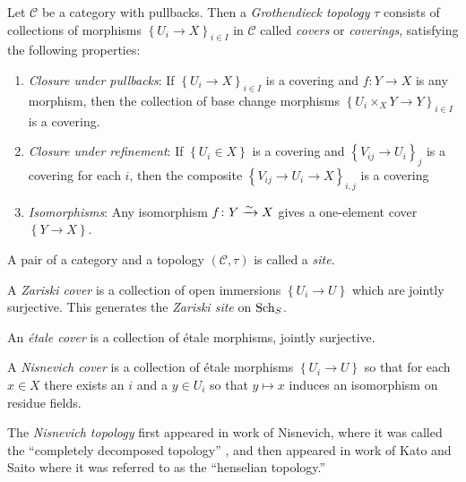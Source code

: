 \documentclass[11pt,openany]{book}
\begin{document}
\begin{definition} Let $\mathscr{C}$ be a category with pullbacks. Then a \textit{Grothendieck topology} $\tau$ consists of collections of morphisms $\left\{ U_i \to X \right\}_{i\in I}$ in $\mathscr{C}$ called \textit{covers} or \textit{coverings}, satisfying the following properties:
\begin{enumerate}
    \item \textit{Closure under pullbacks}: If $\left\{ U_i \to X \right\}_{i\in I}$ is a covering and $f \colon Y \to X$ is any morphism, then the collection of base change morphisms $\left\{ U_i \times_X Y \to Y \right\}_{i\in I}$ is a covering.
    \item \textit{Closure under refinement}: If $\left\{ U_i \in X \right\}$ is a covering and $\left\{ V_{ij} \to U_i \right\}_j$ is a covering for each $i$, then the composite $\left\{ V_{ij} \to U_i \to X \right\}_{i,j}$ is a covering
    \item \textit{Isomorphisms}: Any isomorphism $f\colon Y \xrightarrow{\sim} X$ gives a one-element cover $\left\{ Y \to X \right\}$.
\end{enumerate}
A pair of a category and a topology $(\mathscr{C},\tau)$ is called a \textit{site}.
\end{definition}

\begin{example} A \textit{Zariski cover} is a collection of open immersions $\left\{ U_i \to U \right\}$ which are jointly surjective. This generates the \textit{Zariski site} on $\mathrm{Sch}_S$.
\end{example}

\begin{example} An \textit{\'etale cover} is a collection of \'etale morphisms, jointly surjective.
\end{example}

\begin{example} A \textit{Nisnevich cover} is a collection of \'etale morphisms $\left\{ U_i \to U \right\}$ so that for each $x\in X$ there exists an $i$ and a $y\in U_i$ so that $y\mapsto x$ induces an isomorphism on residue fields.
\end{example}

\begin{remark} The \textit{Nisnevich topology} first appeared in work of Nisnevich, where it was called the ``completely decomposed topology'' \cite{Nis80}, and then appeared in work of Kato and Saito \cite{KS-Global} where it was referred to as the ``henselian topology.''
\end{remark}
\end{document}
